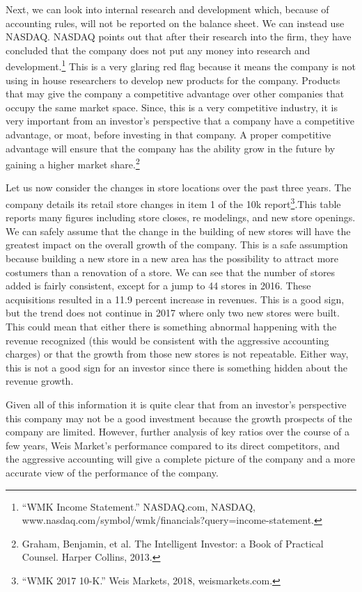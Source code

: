 \documentclass[12pt]{article}
\begin{document}
\begin{doublespacing}
Next, we can look into internal research and development which, because of accounting rules, will not be reported on the balance sheet. We can instead use NASDAQ. NASDAQ points out that after their research into the firm, they have concluded that the company does not put any money into research and development.\footnote{“WMK Income Statement.” NASDAQ.com, NASDAQ, www.nasdaq.com/symbol/wmk/financials?query=income-statement.} This is a very glaring red flag because it means the company is not using in house researchers to develop new products for the company. Products that may give the company a competitive advantage over other companies that occupy the same market space. Since, this is a very competitive industry, it is very important from an investor's perspective that a company have a competitive advantage, or moat, before investing in that company. A proper competitive advantage will ensure that the company has the ability grow in the future by gaining a higher market share.\footnote{Graham, Benjamin, et al. The Intelligent Investor: a Book of Practical Counsel. Harper Collins, 2013.}

Let us now consider the changes in store locations over the past three years. The company details its retail store changes in item 1 of the 10k report\footnote{“WMK 2017 10-K.” Weis Markets, 2018, weismarkets.com.}.This table reports many figures including store closes, re modelings, and new store openings. We can safely assume that the change in the building of new stores will have the greatest impact on the overall growth of the company. This is a safe assumption because building a new store in a new area has the possibility to attract more costumers than a renovation of a store. We can see that the number of stores added is fairly consistent, except for a jump to 44 stores in 2016. These acquisitions resulted in a 11.9 percent increase in revenues. This is a good sign, but the trend does not continue in 2017 where only two new stores were built. This could mean that either there is something abnormal happening with the revenue recognized (this would be consistent with the aggressive accounting charges) or that the growth from those new stores is not repeatable. Either way, this is not a good sign for an investor since there is something hidden about the revenue growth. 

Given all of this information it is quite clear that from an investor's perspective this company may not be a good investment because the growth prospects of the company are limited. However, further analysis of key ratios over the course of a few years, Weis Market's performance compared to its direct competitors, and the aggressive accounting will give a complete picture of the company and a more accurate view of the performance of the company.
\\


\end{doublespacing}
\end{document}
